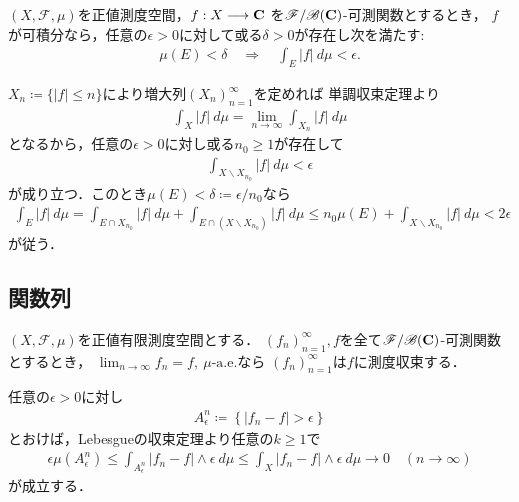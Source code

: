 	\begin{screen}
		\begin{thm}[可積分なら積分値を一様に小さくできる]\label{thm:integrable_intvalue_uniformly_shrinking}
			$(X,\mathscr{F},\mu)$を正値測度空間，$f:X \longrightarrow \mathbf{C}$
			を$\mathscr{F}/\mathscr{B}(\mathbf{C})$-可測関数とするとき，
			$f$が可積分なら，任意の$\epsilon > 0$に対して或る$\delta > 0$が存在し次を満たす:
			\begin{align}
				\mu(E) < \delta \quad \Longrightarrow \quad \int_E |f|\ d\mu < \epsilon.
			\end{align}
		\end{thm}
	\end{screen}
	
	\begin{prf}
		$X_n \coloneqq \{|f| \leq n\}$により増大列$(X_n)_{n=1}^\infty$を定めれば
		単調収束定理より
		\begin{align}
			\int_X |f|\ d\mu = \lim_{n \to \infty} \int_{X_n} |f|\ d\mu
		\end{align}
		となるから，任意の$\epsilon > 0$に対し或る$n_0 \geq 1$が存在して
		\begin{align}
			\int_{X \backslash X_{n_0}} |f|\ d\mu < \epsilon
		\end{align}
		が成り立つ．このとき$\mu(E) < \delta \coloneqq \epsilon/n_0$なら
		\begin{align}
			\int_E |f|\ d\mu
			= \int_{E \cap X_{n_0}} |f|\ d\mu + \int_{E \cap (X \backslash X_{n_0})} |f|\ d\mu
			\leq n_0 \mu(E) + \int_{X \backslash X_{n_0}} |f|\ d\mu
			< 2\epsilon
		\end{align}
		が従う．
		\QED
	\end{prf}
	
	\subsection{関数列}
		\begin{screen}
			\begin{dfn}[概収束すれば測度収束する]
				$(X,\mathscr{F},\mu)$を正値有限測度空間とする．
				$(f_n)_{n=1}^\infty,f$を全て$\mathscr{F}/\mathscr{B}(\mathbf{C})$-可測関数とするとき，
				$\lim_{n \to \infty} f_n = f,\ \mbox{$\mu$-a.e.}$なら
				$(f_n)_{n=1}^\infty$は$f$に測度収束する．
			\end{dfn}
		\end{screen}
		
		\begin{prf}
			任意の$\epsilon > 0$に対し
			\begin{align}
				A^n_\epsilon \coloneqq \left\{ |f_n - f| > \epsilon \right\}
			\end{align}
			とおけば，Lebesgueの収束定理より任意の$k \geq 1$で
			\begin{align}
				\epsilon \mu\left(A^n_\epsilon\right)
				\leq \int_{A^n_\epsilon} |f_n - f| \wedge \epsilon\ d\mu
				\leq \int_{X} |f_n - f| \wedge \epsilon\ d\mu
				\longrightarrow 0
				\quad (n \longrightarrow \infty)
			\end{align}
			が成立する．
			\QED
		\end{prf}
		
